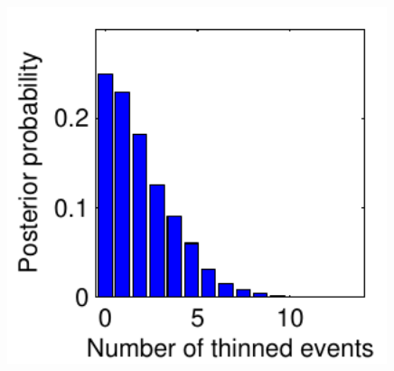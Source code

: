 \documentclass{statsoc}
\begin{document}
\begin{figure}
\begin{minipage}[h]{0.25\linewidth}
  \end{minipage}
  \begin{minipage}[h]{0.25\linewidth}
  \centering
    \includegraphics[width=0.99\textwidth]{figs/swed_hc_num_prim.pdf} 
  \end{minipage}
  \end{figure}
\end{document}
